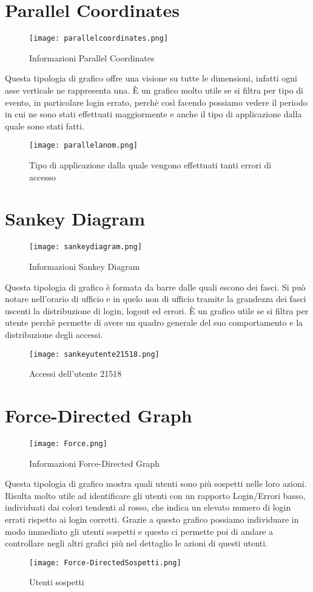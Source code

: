 \section{Parallel Coordinates}
\begin{figure}[H]
	\centering
	\texttt{[image: parallelcoordinates.png]}
	\caption{Informazioni Parallel Coordinates}
  \end{figure}
Questa tipologia di grafico offre una visione su tutte le dimensioni, infatti ogni asse verticale ne rappresenta una. È un grafico molto utile se si filtra per tipo di evento, in particolare login errato, perchè così facendo possiamo vedere il periodo in cui ne sono stati effettuati maggiormente e anche il tipo di applicazione dalla quale sono stati fatti.
\begin{figure}[H]
	\centering
	\texttt{[image: parallelanom.png]}
	\caption{Tipo di applicazione dalla quale vengono effettuati tanti errori di accesso}
\end{figure}

\section{Sankey Diagram}
\begin{figure}[H]
	\centering
	\texttt{[image: sankeydiagram.png]}
	\caption{Informazioni Sankey Diagram}
  \end{figure}
Questa tipologia di grafico è formata da barre dalle quali escono dei fasci. Si può notare nell'orario di ufficio e in quelo non di ufficio tramite la grandezza dei fasci uscenti la distribuzione di login, logout ed errori. È un grafico utile se si filtra per utente perchè permette di avere un quadro generale del suo comportamento e la distribuzione degli accessi.
\begin{figure}[H]
	\centering
	\texttt{[image: sankeyutente21518.png]}
	\caption{Accessi dell'utente 21518}
\end{figure}

\section{Force-Directed Graph}
\begin{figure}[H]
	\centering
	\texttt{[image: Force.png]}
	\caption{Informazioni Force-Directed Graph}
  \end{figure}
Questa tipologia di grafico mostra quali utenti sono più sospetti nelle loro azioni. Risulta molto utile ad identificare gli utenti con un rapporto Login/Errori basso, individuati dai colori tendenti al rosso, che indica un elevato numero di login errati rispetto ai login corretti. Grazie a questo grafico possiamo individuare in modo immediato gli utenti sospetti e questo ci permette poi di andare a controllare negli altri grafici più nel dettaglio le azioni di questi utenti.

\begin{figure}[H]
	\centering
	\texttt{[image: Force-DirectedSospetti.png]}
	\caption{Utenti sospetti}
\end{figure}
